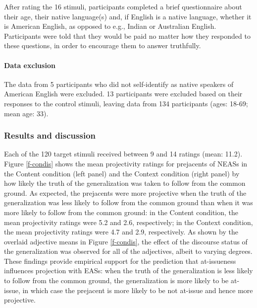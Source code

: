 \documentclass[11pt,fleqn]{article}
\newcommand{\6}{\mbox{$[\hspace*{-.6mm}[$}}
\newcommand{\9}{\mbox{$]\hspace*{-.6mm}]$}}
\begin{document}
After rating the 16 stimuli, participants completed a brief questionnaire about their age, their
native language(s) and, if English is a native language, whether it is
American English, as opposed to e.g., Indian or Australian English.
Participants were told that they would be paid no matter how they
responded to these questions, in order to encourage them to answer
truthfully.


\paragraph{Data exclusion} The data from 5 participants who did not self-identify as native speakers of American English were excluded. 13 participants were excluded based on their responses to the control stimuli, leaving data from 134 participants (ages: 18-69; mean age: 33).

\subsubsection{Results and discussion}

Each of the 120 target stimuli received between 9 and 14 ratings (mean: 11.2). Figure \ref{f-condis} shows the mean projectivity ratings for prejacents of NEASs in the Content condition (left panel) and the Context condition (right panel) by how likely the truth of the generalization was taken to follow from the common ground. As expected, the prejacents were more projective when the truth of the generalization was less likely to follow from the common ground than when it was more likely to follow from the common ground: in the Content condition, the mean projectivity ratings were 5.2 and 2.6, respectively; in the Context condition, the mean projectivity ratings were 4.7 and 2.9, respectively. As shown by the overlaid adjective means in Figure \ref{f-condis}, the effect of the discourse status of the generalization was observed for all of the adjectives, albeit to varying degrees. These findings provide empirical support for the prediction that at-issueness influences projection with EASs: when the truth of the generalization is less likely to follow from the common ground, the generalization is more likely to be at-issue, in which case the prejacent is more likely to be not at-issue and hence more projective.
\end{document}
